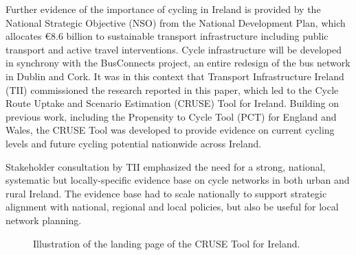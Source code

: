\documentclass[
  super,
  preprint,
  3p]{elsarticle}
\begin{document}
Further evidence of the importance of cycling in Ireland is provided by
the National Strategic Objective (NSO) from the National Development
Plan, which allocates €8.6 billion to sustainable transport
infrastructure including public transport and active travel
interventions. Cycle infrastructure will be developed in synchrony with
the BusConnects project, an entire redesign of the bus network in Dublin
and Cork. It was in this context that Transport Infrastructure Ireland
(TII) commissioned the research reported in this paper, which led to the
Cycle Route Uptake and Scenario Estimation (CRUSE) Tool for Ireland.
Building on previous work, including the Propensity to Cycle Tool (PCT)
for England and Wales, the CRUSE Tool was developed to provide evidence
on current cycling levels and future cycling potential nationwide across
Ireland.

Stakeholder consultation by TII emphasized the need for a strong,
national, systematic but locally-specific evidence base on cycle
networks in both urban and rural Ireland. The evidence base had to scale
nationally to support strategic alignment with national, regional and
local policies, but also be useful for local network planning.

\begin{figure}


\caption{\label{fig-landing}Illustration of the landing page of the
CRUSE Tool for Ireland.}

\end{figure}%
\end{document}
